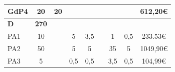 \documentclass[a4paper]{article}
\begin{document}
\begin{table}[H]
\begin{center}
\begin{tabular}{|l|c|c|c|c|c|c|c|c|}
            {\color[HTML]{000000} GdP4}                                                            & {\color[HTML]{000000} 20}                                                               & {\color[HTML]{000000} 20}                 & {\color[HTML]{000000} }                 & {\color[HTML]{000000} }              & {\color[HTML]{000000} }                 & {\color[HTML]{000000} }                   & {\color[HTML]{000000} }                 & {\color[HTML]{000000} 612,20€}             \\ \hline
            \rowcolor[HTML]{C0C0C0} 
            {\color[HTML]{000000} \textbf{D}}                                                      & {\color[HTML]{000000} \textbf{270}}                                                     & {\color[HTML]{000000} \textbf{}}          & {\color[HTML]{000000} \textbf{}}        & {\color[HTML]{000000} \textbf{}}     & {\color[HTML]{000000} \textbf{}}        & {\color[HTML]{000000} \textbf{}}          & {\color[HTML]{000000} \textbf{}}        & {\color[HTML]{000000} \textbf{}}           \\ \hline
            {\color[HTML]{000000} PA1}                                                             & {\color[HTML]{000000} 10}                                                               & {\color[HTML]{000000} }                   & {\color[HTML]{000000} 5}                & {\color[HTML]{000000} 3,5}           & {\color[HTML]{000000} }                 & {\color[HTML]{000000} 1}                  & {\color[HTML]{000000} 0,5}              & {\color[HTML]{000000} 233.53€}             \\ \hline
            {\color[HTML]{000000} PA2}                                                             & {\color[HTML]{000000} 50}                                                               & {\color[HTML]{000000} }                   & {\color[HTML]{000000} 5}                & {\color[HTML]{000000} 5}             & {\color[HTML]{000000} }                 & {\color[HTML]{000000} 35}                  & {\color[HTML]{000000} 5}                & {\color[HTML]{000000} 1049,90€}             \\ \hline
             {\color[HTML]{000000} PA3}                                                             & {\color[HTML]{000000} 5}                                                               & {\color[HTML]{000000} }                   & {\color[HTML]{000000} 0,5}                & {\color[HTML]{000000} 0,5}             & {\color[HTML]{000000} }                 & {\color[HTML]{000000} 3,5}                  & {\color[HTML]{000000} 0,5}                & {\color[HTML]{000000} 104,99€}             \\ \hline

\end{tabular}
\end{center}
\end{table}
\end{document}
